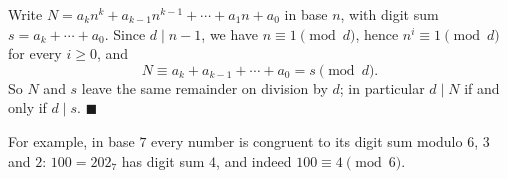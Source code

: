 Write $N=a_kn^k+a_{k-1}n^{k-1}+\cdots+a_1n+a_0$ in base $n$, with digit sum $s=a_k+\cdots+a_0$. Since $d\mid n-1$, we have $n\equiv1\pmod d$, hence $n^i\equiv1\pmod d$ for every $i\ge0$, and
\[N\equiv a_k+a_{k-1}+\cdots+a_0=s\pmod d.\]
So $N$ and $s$ leave the same remainder on division by $d$; in particular $d\mid N$ if and only if $d\mid s$. $\blacksquare$

For example, in base $7$ every number is congruent to its digit sum modulo $6$, $3$ and $2$: $100=202_7$ has digit sum $4$, and indeed $100\equiv4\pmod 6$.
